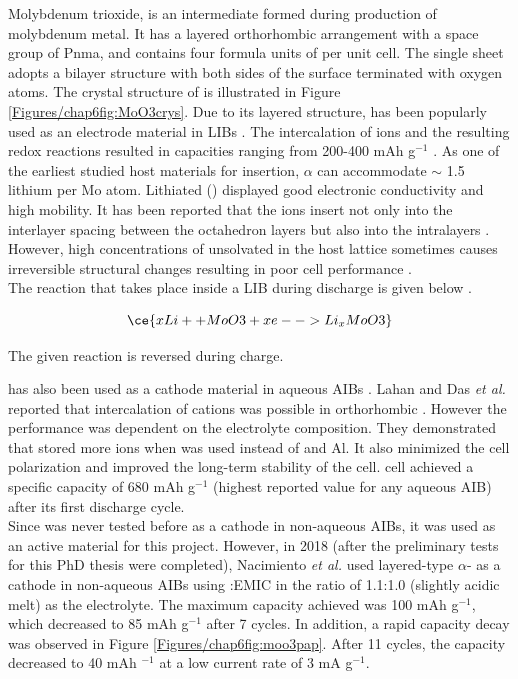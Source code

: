 Molybdenum trioxide,  is an intermediate formed during production of molybdenum metal. It has a layered orthorhombic arrangement with a space group of Pnma, and contains four formula units of  per unit cell. The single sheet adopts a bilayer structure with both sides of the surface terminated with oxygen atoms. The crystal structure of  is illustrated in Figure \ref{Figures/chap6fig:MoO3crys}. Due to its layered structure,  has been popularly used as an electrode material in LIBs \cite{wu_mixed_2017,li_vapor-transportation_2006,tsumura_lithium_1997}. The intercalation of  ions and the resulting redox reactions resulted in capacities ranging from 200-400 mAh g$^{-1}$ \cite{tsumura_lithium_1997,chen_fast_2010,zhou_-moo3_2010}. As one of the earliest studied host materials for  insertion, $\alpha$  can accommodate $\sim$ 1.5 lithium per Mo atom. Lithiated  () displayed good electronic conductivity and high  mobility. It has been reported that the  ions insert not only into the interlayer spacing between the  octahedron layers but also into the  intralayers \cite{li_vapor-transportation_2006,chen_fast_2010}. However, high concentrations of unsolvated  in the host lattice sometimes causes irreversible structural changes resulting in poor cell performance \cite{tao_moo3_2011,li_theoretical_2014}.\\
The reaction that takes place inside a LIB during discharge is given below \cite{li_vapor-transportation_2006}. 

\begin{equation}
    \ce{xLi+ + MoO3 + xe- -> Li_{x}MoO3} 
\end{equation}

The given reaction is reversed during charge.

 has also been used as a cathode material in aqueous AIBs \cite{joseph_hexagonal_2019, shakir_structural_2010, lahan_al3+_2019, lahan_active_2018}. Lahan and Das \textit{et al.} reported that intercalation of  cations was possible in orthorhombic . However the performance was dependent on the electrolyte composition. They demonstrated that  stored more  ions when  was used instead of  and Al. It also minimized the cell polarization and improved the long-term stability of the cell.  cell achieved a specific capacity of 680 mAh g$^{-1}$ (highest reported value for any aqueous AIB) after its first discharge cycle. \\ 
Since  was never tested before as a cathode in non-aqueous AIBs, it was used as an active material for this project. However, in 2018 (after the preliminary tests for this PhD thesis were completed), Nacimiento \textit{et al.} used layered-type $\alpha$- as a cathode in non-aqueous AIBs using :EMIC in the ratio of 1.1:1.0 (slightly acidic melt) as the electrolyte. The maximum capacity achieved was 100 mAh g$^{-1}$, which decreased to 85 mAh g$^{-1}$ after 7 cycles. In addition, a rapid capacity decay was observed in Figure \ref{Figures/chap6fig:moo3pap}. After 11 cycles, the capacity decreased to 40 mAh $^{-1}$ at a low current rate of 3 mA g$^{-1}$. 

